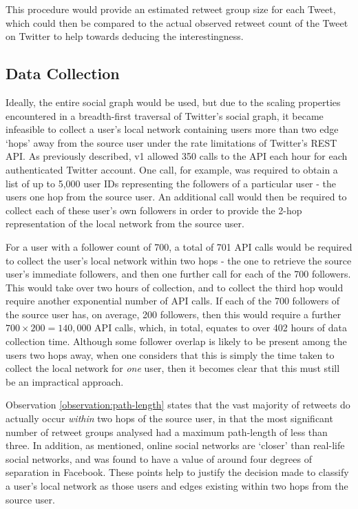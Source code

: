 This procedure would provide an estimated retweet group size for each Tweet, which could then be compared to the actual observed retweet count of the Tweet on Twitter to help towards deducing the interestingness.


\subsection{Data Collection}
Ideally, the entire social graph would be used, but due to the scaling properties encountered in a breadth-first traversal of Twitter's social graph, it became infeasible to collect a user's local network containing users more than two edge `hops' away from the source user under the rate limitations of Twitter's REST API. As previously described, v1 allowed 350 calls to the API each hour for each authenticated Twitter account. One call, for example, was required to obtain a list of up to 5,000 user IDs representing the followers of a particular user - the users one hop from the source user. An additional call would then be required to collect each of these user's own followers in order to provide the 2-hop representation of the local network from the source user.

For a user with a follower count of 700, a total of 701 API calls would be required to collect the user's local network within two hops - the one to retrieve the source user's immediate followers, and then one further call for each of the 700 followers. This would take over two hours of collection, and to collect the third hop would require another exponential number of API calls. If each of the 700 followers of the source user has, on average, 200 followers, then this would require  a further $700 \times 200 = 140,000$ API calls, which, in total, equates to over 402 hours of data collection time. Although some follower overlap is likely to be present among the users two hops away, when one considers that this is simply the time taken to collect the local network for \textit{one} user, then it becomes clear that this must still be an impractical approach.

Observation \ref{observation:path-length} states that the vast majority of retweets do actually occur \textit{within} two hops of the source user, in that the most significant number of retweet groups analysed had a maximum path-length of less than three. In addition, as mentioned, online social networks are `closer' than real-life social networks, and was found to have a value of around four degrees of separation in Facebook. These points help to justify the decision made to classify a user's local network as those users and edges existing within two hops from the source user.

